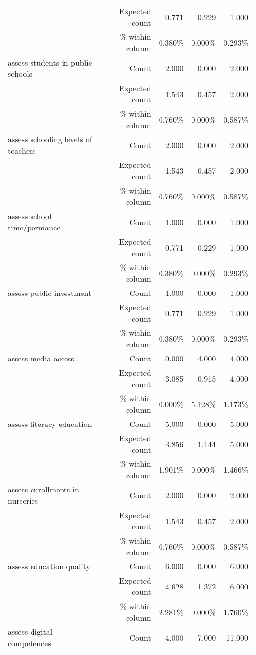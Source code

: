 \documentclass[6pt, oneside]{article}   	%
\begin{document}
\begin{table}[h]
{\begin{tabular}{lrrrr}
			 & Expected count & 0.771 & 0.229 & 1.000  \\
			 &  \% within column & 0.380\% & 0.000\% & 0.293\%  \\
			assess students in public schools & Count & 2.000 & 0.000 & 2.000  \\
			 & Expected count & 1.543 & 0.457 & 2.000  \\
			 &  \% within column & 0.760\% & 0.000\% & 0.587\%  \\
			assess schooling levels of teachers & Count & 2.000 & 0.000 & 2.000  \\
			 & Expected count & 1.543 & 0.457 & 2.000  \\
			 &  \% within column & 0.760\% & 0.000\% & 0.587\%  \\
			assess school time/permance & Count & 1.000 & 0.000 & 1.000  \\
			 & Expected count & 0.771 & 0.229 & 1.000  \\
			 &  \% within column & 0.380\% & 0.000\% & 0.293\%  \\
			assess public investment & Count & 1.000 & 0.000 & 1.000  \\
			 & Expected count & 0.771 & 0.229 & 1.000  \\
			 &  \% within column & 0.380\% & 0.000\% & 0.293\%  \\
			assess media access & Count & 0.000 & 4.000 & 4.000  \\
			 & Expected count & 3.085 & 0.915 & 4.000  \\
			 &  \% within column & 0.000\% & 5.128\% & 1.173\%  \\
			assess literacy education & Count & 5.000 & 0.000 & 5.000  \\
			 & Expected count & 3.856 & 1.144 & 5.000  \\
			 &  \% within column & 1.901\% & 0.000\% & 1.466\%  \\
			assess enrollments in nurseries & Count & 2.000 & 0.000 & 2.000  \\
			 & Expected count & 1.543 & 0.457 & 2.000  \\
			 &  \% within column & 0.760\% & 0.000\% & 0.587\%  \\
			assess education quality & Count & 6.000 & 0.000 & 6.000  \\
			 & Expected count & 4.628 & 1.372 & 6.000  \\
			 &  \% within column & 2.281\% & 0.000\% & 1.760\%  \\
			assess digital competences & Count & 4.000 & 7.000 & 11.000  \\

\end{tabular}}
\end{table}
\end{document}
